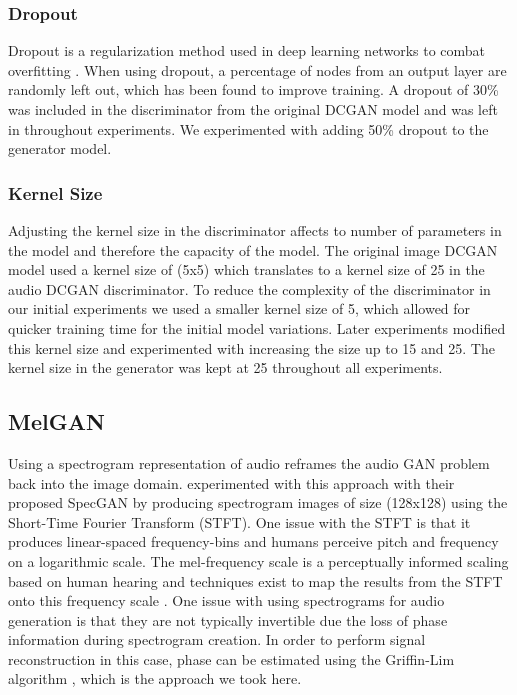 \subsubsection{Dropout}
Dropout is a regularization method used in deep learning networks to combat overfitting \cite{srivastava2014dropout}. When using dropout, a percentage of nodes from an output layer are randomly left out, which has been found to improve training. A dropout of 30\% was included in the discriminator from the original DCGAN model and was left in throughout experiments. We experimented with adding 50\% dropout to the generator model.

\subsubsection{Kernel Size}
Adjusting the kernel size in the discriminator affects to number of parameters in the model and therefore the capacity of the model. The original image DCGAN model used a kernel size of (5x5) which translates to a kernel size of 25 in the audio DCGAN discriminator. To reduce the complexity of the discriminator in our initial experiments we used a smaller kernel size of 5, which allowed for quicker training time for the initial model variations. Later experiments modified this kernel size and experimented with increasing the size up to 15 and 25. The kernel size in the generator was kept at 25 throughout all experiments.

\subsection{MelGAN}\label{sec:methods_melgan}
Using a spectrogram representation of audio reframes the audio GAN problem back into the image domain. \cite{donahue2018adversarial} experimented with this approach with their proposed SpecGAN by producing spectrogram images of size (128x128) using the Short-Time Fourier Transform (STFT). One issue with the STFT is that it produces linear-spaced frequency-bins and humans perceive pitch and frequency on a logarithmic scale. The mel-frequency scale is a perceptually informed scaling based on human hearing and techniques exist to map the results from the STFT onto this frequency scale \cite{stevens1940relation}. One issue with using spectrograms for audio generation is that they are not typically invertible due the loss of phase information during spectrogram creation. In order to perform signal reconstruction in this case, phase can be estimated using the Griffin-Lim algorithm \cite{griffin1984signal}, which is the approach we took here.

